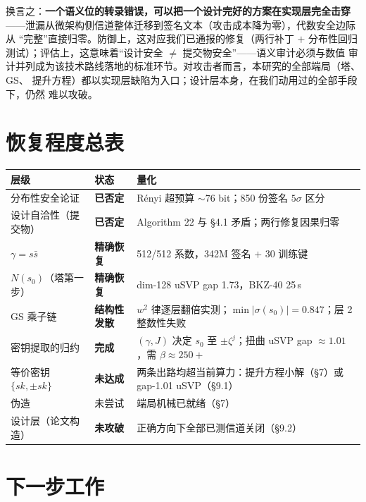 \documentclass[UTF8,11pt,a4paper]{ctexart}
\begin{document}
换言之：\textbf{一个语义位的转录错误，可以把一个设计完好的方案在实现层完全击穿}
——泄漏从微架构侧信道整体迁移到签名文本（攻击成本降为零），代数安全边际从
``完整''直接归零。防御上，这对应我们已通报的修复（两行补丁 $+$ 分布性回归
测试）；评估上，这意味着``设计安全 $\neq$ 提交物安全''——语义审计必须与数值
审计并列成为该技术路线落地的标准环节。对攻击者而言，本研究的全部端局（塔、GS、
提升方程）都以实现层缺陷为入口；设计层本身，在我们动用过的全部手段下，仍然
难以攻破。

\section{恢复程度总表}

\begin{table}[htbp]\centering\small
\begin{tabular}{@{}lll@{}}
\toprule
层级 & 状态 & 量化 \\
\midrule
分布性安全论证 & \textbf{已否定} & R\'enyi 超预算 ${\sim}76$ bit；850 份签名 $5\sigma$ 区分 \\
设计自洽性（提交物） & \textbf{已否定} & Algorithm 22 与 \S4.1 矛盾；两行修复因果归零 \\
$\gamma = s\bar s$ & \textbf{精确恢复} & 512/512 系数，342M 签名 $+$ 30 训练键 \\
$N(s_0)$（塔第一步） & \textbf{精确恢复} & dim-128 uSVP gap 1.73，BKZ-40 25\,s \\
GS 乘子链 & \textbf{结构性发散} & $w^2$ 律逐层翻倍实测；$\min|\sigma(s_0)| = 0.847$；层 2 整数性失败 \\
密钥提取的归约 & \textbf{完成} & $(\gamma,J)$ 决定 $s_0$ 至 $\pm\zeta^j$；扭曲 uSVP gap $\approx 1.01$，需 $\beta \approx 250{+}$ \\
等价密钥 $\{sk, \pm sk\}$ & \textbf{未达成} & 两条出路均超当前算力：提升方程小解（\S7）或 gap-1.01 uSVP（\S9.1） \\
伪造 & 未尝试 & 端局机械已就绪（\S7） \\
设计层（论文构造） & \textbf{未攻破} & 正确方向下全部已测信道关闭（\S9.2） \\
\bottomrule
\end{tabular}
\end{table}

\section{下一步工作}
\end{document}
